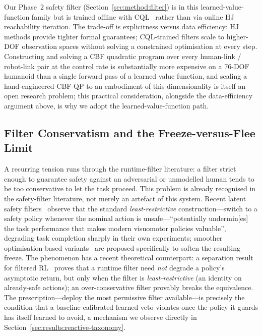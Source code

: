 \documentclass[11pt,a4paper]{report}
\begin{document}
Our Phase~2 safety filter (Section~\ref{sec:method:filter}) is in
this learned-value-function family but is trained offline with
\textsc{CQL}~\cite{kumar2020cql} rather than via online HJ
reachability iteration. The trade-off is explicitness versus
data efficiency: HJ methods provide tighter formal guarantees;
\textsc{CQL}-trained filters scale to higher-DOF observation spaces
without solving a constrained optimisation at every step.
Constructing and solving a CBF quadratic program over every
human-link / robot-link pair at the control rate is substantially
more expensive on a 76-DOF humanoid than a single forward pass of a
learned value function, and scaling a hand-engineered CBF-QP to an
embodiment of this dimensionality is itself an open research
problem; this practical consideration, alongside the data-efficiency
argument above, is why we adopt the learned-value-function path.

\subsection{Filter Conservatism and the Freeze-versus-Flee Limit}
\label{sec:bg:cbf:conservatism}

A recurring tension runs through the runtime-filter literature: a
filter strict enough to guarantee safety against an adversarial or
unmodelled human tends to be too conservative to let the task proceed.
This problem is already recognised in the safety-filter literature,
not merely an artefact of this system. Recent latent safety
filters~\cite{nakamura2025latent} observe
that the standard \emph{least-restrictive} construction---switch to a
safety policy whenever the nominal action is unsafe---``potentially
undermin[es] the task performance that makes modern visuomotor policies
valuable'', degrading task completion sharply in their own experiments;
smoother optimisation-based variants~\cite{latentcbf2025} are proposed
specifically to soften the resulting freeze. The phenomenon has a recent
theoretical counterpart: a separation result for filtered
RL~\cite{permissivefilter2025} proves that a runtime filter need
\emph{not} degrade a policy's asymptotic return, but only when the
filter is \emph{least-restrictive} (an identity on already-safe
actions); an over-conservative filter provably breaks the equivalence.
The prescription---deploy the most permissive filter available---is
precisely the condition that a baseline-calibrated learned veto violates
once the policy it guards has itself learned to avoid, a mechanism we
observe directly in Section~\ref{sec:results:reactive-taxonomy}.
\end{document}
